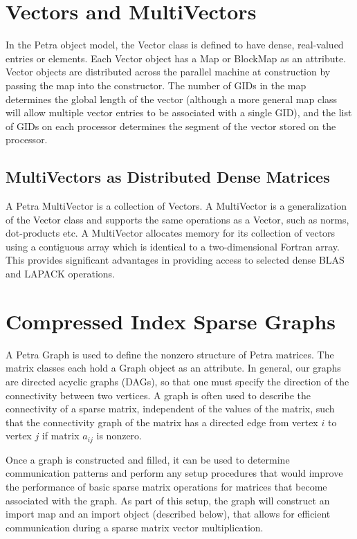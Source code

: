 \documentclass[12pt,relax]{PetraObjectModel}
\begin{document}
\section{Vectors and MultiVectors}
In the Petra object model, the Vector class is defined to have dense,
real-valued entries or elements. Each Vector object has a Map or BlockMap as
an attribute.  Vector objects are distributed across the 
parallel machine at construction by passing the map into the constructor.  
The number of GIDs in the map determines the global length of the vector 
(although a more general map class will allow multiple vector entries to 
be associated with a single GID), and the list of GIDs on each processor 
determines the segment of the vector stored on the processor.

\subsection{MultiVectors as Distributed Dense Matrices}
A Petra MultiVector is a collection of Vectors. A MultiVector is a
generalization of the Vector class and supports the
same operations as a Vector, such as norms, dot-products etc. A MultiVector
allocates memory for its collection of vectors using a contiguous array which
is identical to a two-dimensional Fortran array. This provides significant
advantages in providing access to selected dense BLAS and LAPACK operations.

\section{Compressed Index Sparse Graphs}
A Petra Graph is used to define the nonzero structure of Petra matrices. The
matrix classes each hold a Graph object as an attribute.
In general, our graphs are directed acyclic graphs (DAGs), so that one must
specify the direction of the connectivity between two vertices.  A graph is
often used to describe the connectivity of a sparse matrix, independent of
the values of the matrix, such that the connectivity graph of the matrix has
a directed edge from vertex $i$ to vertex $j$ if matrix $a_{ij}$ is nonzero.

Once a graph is constructed and filled, it can be used to determine
communication patterns and perform any setup procedures that would improve
the performance of basic sparse matrix operations for matrices that become
associated with the graph.  As part of this setup, the graph will construct
an import map and an import object (described below), that allows for
efficient communication during a sparse matrix vector multiplication.
\end{document}
